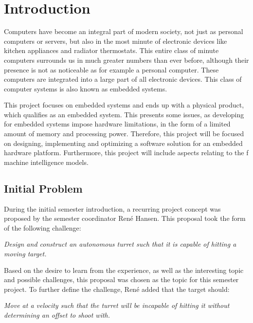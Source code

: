 \chapter{Introduction}
Computers have become an integral part of modern society, not just as personal
computers or servers, but also in the most minute of electronic devices
like kitchen appliances and radiator thermostats. This entire class of minute
computers surrounds us in much greater numbers than ever before, although their
presence is not as noticeable as for example a personal computer. These
computers are integrated into a large part of all electronic devices. This class
of computer systems is also known as embedded systems.\nl


This project focuses on embedded systems and ends up with a physical product,
which qualifies as an embedded system. This presents some issues, as
developing for embedded systems impose hardware limitations, in the form of a
limited amount of memory and processing power. Therefore, this project will be
focused on designing, implementing and optimizing a software solution for an
embedded hardware platform. Furthermore, this project will include
aspects relating to the f machine intelligence models.

\section{Initial Problem}\label{InitialProblem}
During the initial semester introduction, a recurring project concept was
proposed by the semester coordinator Ren\'e Hansen. This proposal took the
form of the following challenge:

\begin{center}
\begin{minipage}{0.8\linewidth}
\textit{Design and construct an autonomous turret such that it is capable of
hitting a moving target.}
\end{minipage}
\end{center}

Based on the desire to learn from the experience, as well as the interesting
topic and possible challenges, this proposal was chosen as the topic for this
semester project. To further define the challenge, Ren\'e added that the target
should:
\begin{center}
\begin{minipage}{0.8\linewidth}
\textit{Move at a velocity such that the turret will be incapable
of hitting it without determining an offset to shoot with.}
\end{minipage}
\end{center}

